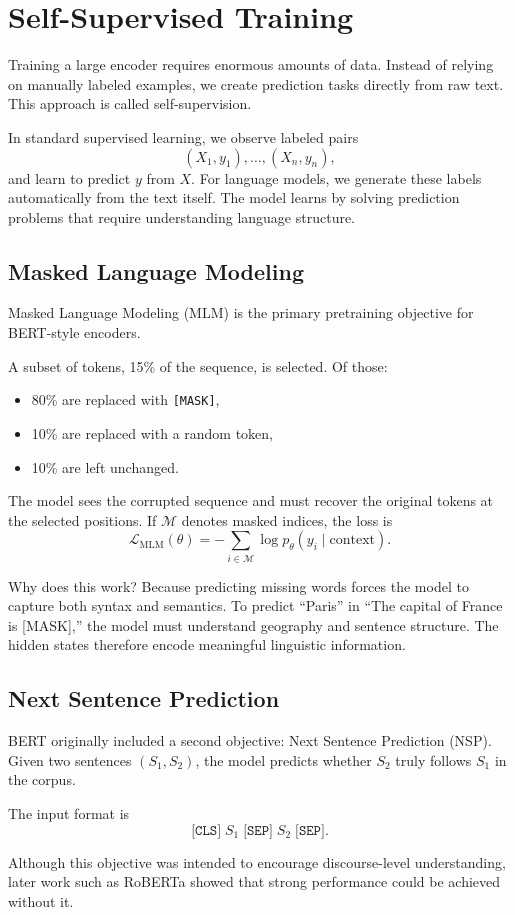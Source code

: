 \section{Self-Supervised Training}
\medskip

Training a large encoder requires enormous amounts of data. Instead of relying on manually labeled examples, we create prediction tasks directly from raw text. This approach is called self-supervision.

In standard supervised learning, we observe labeled pairs
\[
(X_1, y_1), \dots, (X_n, y_n),
\]
and learn to predict $y$ from $X$. For language models, we generate these labels automatically from the text itself. The model learns by solving prediction problems that require understanding language structure.

\bigskip
\subsection{Masked Language Modeling}
\medskip

Masked Language Modeling (MLM) is the primary pretraining objective for BERT-style encoders.

A subset of tokens, 15\% of the sequence, is selected. Of those:
\begin{itemize}
    \item 80\% are replaced with \texttt{[MASK]},
    \item 10\% are replaced with a random token,
    \item 10\% are left unchanged.
\end{itemize}

The model sees the corrupted sequence and must recover the original tokens at the selected positions. If $\mathcal{M}$ denotes masked indices, the loss is
\[
\mathcal{L}_{\text{MLM}}(\theta)
=
-\sum_{i \in \mathcal{M}}
\log p_\theta(y_i \mid \text{context}).
\]

Why does this work? Because predicting missing words forces the model to capture both syntax and semantics. To predict ``Paris'' in ``The capital of France is [MASK],'' the model must understand geography and sentence structure. The hidden states therefore encode meaningful linguistic information.

\bigskip
\subsection{Next Sentence Prediction}
\medskip

BERT originally included a second objective: Next Sentence Prediction (NSP). Given two sentences $(S_1, S_2)$, the model predicts whether $S_2$ truly follows $S_1$ in the corpus.

The input format is
\[
\texttt{[CLS]} \; S_1 \; \texttt{[SEP]} \; S_2 \; \texttt{[SEP]}.
\]

Although this objective was intended to encourage discourse-level understanding, later work such as RoBERTa showed that strong performance could be achieved without it.

\bigskip

